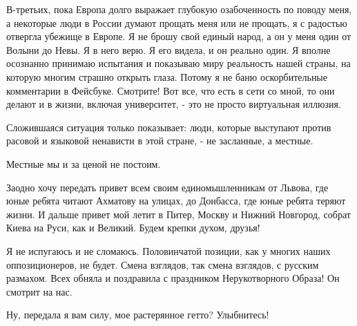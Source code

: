 В-третьих, пока Европа долго выражает глубокую озабоченность по поводу меня, а
некоторые люди в России думают прощать меня или не прощать, я с радостью
отвергла убежище в Европе. Я не брошу свой единый народ, а он у меня один от
Волыни до Невы. Я в него верю. Я его видела, и он реально один. Я вполне
осознанно принимаю испытания и показываю миру реальность нашей страны, на
которую многим страшно открыть глаза. Потому я не баню оскорбительные
комментарии в Фейсбуке. Смотрите! Вот все, что есть в сети со мной, то они
делают и в жизни, включая университет, - это не просто виртуальная иллюзия.

Сложившаяся ситуация только показывает: люди, которые выступают против расовой
и языковой ненависти в этой стране, - не засланные, а местные. 

Местные мы и за ценой не постоим. 

Заодно хочу передать привет всем своим единомышленникам от Львова, где юные
ребята читают Ахматову на улицах, до Донбасса, где юные ребята теряют жизни. И
дальше привет мой летит в Питер, Москву и Нижний Новгород, собрат Киева на
Руси, как и Великий. Будем крепки духом, друзья! 

Я не испугаюсь и не сломаюсь. Половинчатой позиции, как у многих наших
оппозиционеров, не будет. Смена взглядов, так смена взглядов, с русским
размахом. Всех обняла и поздравила с праздником Нерукотворного Образа! Он
смотрит на нас.

Ну, передала я вам силу, мое растерянное гетто? Улыбнитесь!

